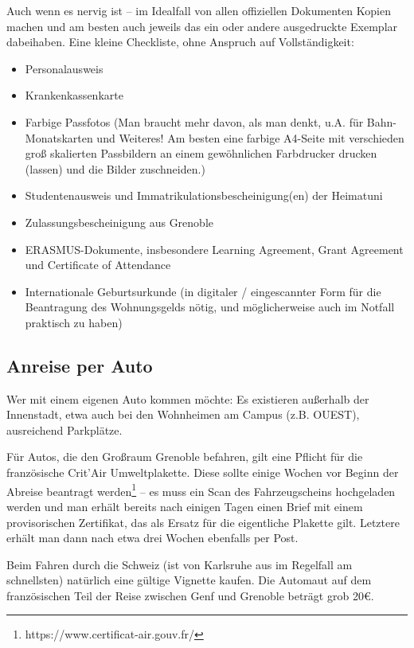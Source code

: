 \documentclass[11pt,a4paper]{article}
\begin{document}
	Auch wenn es nervig ist -- im Idealfall von allen offiziellen Dokumenten Kopien machen und am besten auch jeweils das ein oder andere ausgedruckte Exemplar dabeihaben. Eine kleine Checkliste, ohne Anspruch auf Vollständigkeit:
	
	\begin{itemize}
		\item Personalausweis
		\item Krankenkassenkarte
		\item Farbige Passfotos (Man braucht mehr davon, als man denkt, u.A. für Bahn-Monatskarten und Weiteres! Am besten eine farbige A4-Seite mit verschieden groß skalierten Passbildern an einem gewöhnlichen Farbdrucker drucken (lassen) und die Bilder zuschneiden.)
		\item Studentenausweis und Immatrikulationsbescheinigung(en) der Heimatuni
		\item Zulassungsbescheinigung aus Grenoble
		\item ERASMUS-Dokumente, insbesondere Learning Agreement, Grant Agreement und Certificate of Attendance
		\item Internationale Geburtsurkunde (in digitaler / eingescannter Form für die Beantragung des Wohnungsgelds nötig, und möglicherweise auch im Notfall praktisch zu haben)
	\end{itemize}

	\subsection{Anreise per Auto}
	
	Wer mit einem eigenen Auto kommen möchte: Es existieren außerhalb der Innenstadt, etwa auch bei den Wohnheimen am Campus (z.B. OUEST), ausreichend Parkplätze. 
	
	Für Autos, die den Großraum Grenoble befahren, gilt eine Pflicht für die französische Crit'Air Umweltplakette. Diese sollte einige Wochen vor Beginn der Abreise beantragt werden\footnote{https://www.certificat-air.gouv.fr/} -- es muss ein Scan des Fahrzeugscheins hochgeladen werden und man erhält bereits nach einigen Tagen einen Brief mit einem provisorischen Zertifikat, das als Ersatz für die eigentliche Plakette gilt. Letztere erhält man dann nach etwa drei Wochen ebenfalls per Post.
	
	Beim Fahren durch die Schweiz (ist von Karlsruhe aus im Regelfall am schnellsten) natürlich eine gültige Vignette kaufen. Die Automaut auf dem französischen Teil der Reise zwischen Genf und Grenoble beträgt grob 20€.
\end{document}
